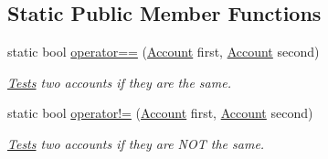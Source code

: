 \subsection*{Static Public Member Functions}
\begin{DoxyCompactItemize}
\item 
static bool \hyperlink{classCore_1_1Models_1_1Account_a090b2c4d7219852aafc5df14963f6762}{operator==} (\hyperlink{classCore_1_1Models_1_1Account}{Account} first, \hyperlink{classCore_1_1Models_1_1Account}{Account} second)
\begin{DoxyCompactList}\small\item\em \hyperlink{namespaceTests}{Tests} two accounts if they are the same. \end{DoxyCompactList}\item 
static bool \hyperlink{classCore_1_1Models_1_1Account_ac504e5ce7be8340f852b532d378389d9}{operator!=} (\hyperlink{classCore_1_1Models_1_1Account}{Account} first, \hyperlink{classCore_1_1Models_1_1Account}{Account} second)
\begin{DoxyCompactList}\small\item\em \hyperlink{namespaceTests}{Tests} two accounts if they are N\+O\+T the same. \end{DoxyCompactList}\end{DoxyCompactItemize}
